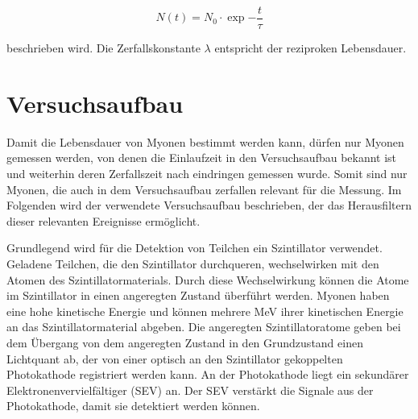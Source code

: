 \begin{equation}
  \label{eqn:Lebensdauer}
  N(t) = N_0\cdot\exp{-\frac{t}{\tau}}
\end{equation}

beschrieben wird. Die Zerfallskonstante $\lambda$ entspricht der reziproken
Lebensdauer.





\section{Versuchsaufbau}

Damit die Lebensdauer von Myonen bestimmt werden kann, dürfen nur
Myonen gemessen werden, von denen die Einlaufzeit in den Versuchsaufbau bekannt ist
und weiterhin deren Zerfallszeit nach eindringen gemessen wurde.
Somit sind nur Myonen, die auch in dem Versuchsaufbau zerfallen relevant
für die Messung. Im Folgenden wird der verwendete Versuchsaufbau beschrieben,
der das Herausfiltern dieser relevanten Ereignisse ermöglicht.

Grundlegend wird für die Detektion von Teilchen ein Szintillator verwendet.
Geladene Teilchen, die den Szintillator durchqueren, wechselwirken mit den Atomen
des Szintillatormaterials. Durch diese Wechselwirkung können
die Atome im Szintillator in einen angeregten Zustand überführt werden.
Myonen haben eine hohe kinetische Energie und können mehrere MeV ihrer kinetischen Energie
an das Szintillatormaterial abgeben. Die angeregten Szintillatoratome geben
bei dem Übergang von dem angeregten Zustand in den Grundzustand einen Lichtquant
ab, der von einer optisch an den Szintillator gekoppelten Photokathode
registriert werden kann.
An der Photokathode liegt ein sekundärer Elektronenvervielfältiger (SEV) an.
Der SEV verstärkt die Signale aus der Photokathode, damit sie detektiert werden
können.

